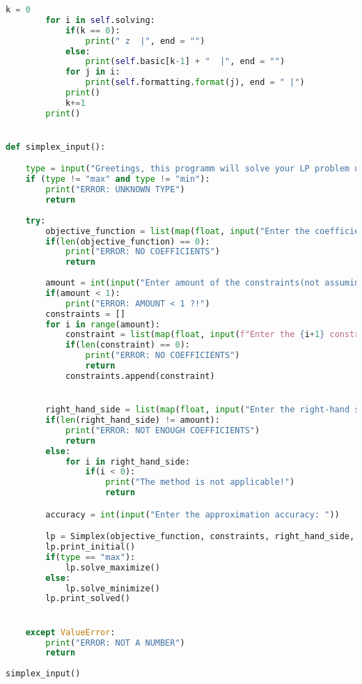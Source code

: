 \documentclass[12pt, legalpaper]{exam}
\begin{document}
\begin{lstlisting}[language=Python, caption=Программа на Python, label=lst:python-code]
        k = 0
        for i in self.solving:
            if(k == 0):
                print(" z  |", end = "")
            else:
                print(self.basic[k-1] + "  |", end = "")
            for j in i:
                print(self.formatting.format(j), end = " |")
            print()
            k+=1
        print()


def simplex_input():

    type = input("Greetings, this programm will solve your LP problem using Simplex method.\nEnter the type of the problem(Max/Min): ").lower()
    if (type != "max" and type != "min"):
        print("ERROR: UNKNOWN TYPE")
        return
    
    try:
        objective_function = list(map(float, input("Enter the coefficients of the objective function: ").split(" ")))
        if(len(objective_function) == 0):
            print("ERROR: NO COEFFICIENTS")
            return
        
        amount = int(input("Enter amount of the constraints(not assuming x>=0): "))
        if(amount < 1):
            print("ERROR: AMOUNT < 1 ?!")
        constraints = []
        for i in range(amount):
            constraint = list(map(float, input(f"Enter the {i+1} constraint function coefficients: ").split(" ")))
            if(len(constraint) == 0):
                print("ERROR: NO COEFFICIENTS")
                return
            constraints.append(constraint)


        right_hand_side = list(map(float, input("Enter the right-hand side numbers: ").split(" ")))
        if(len(right_hand_side) != amount):
            print("ERROR: NOT ENOUGH COEFFICIENTS")
            return
        else:
            for i in right_hand_side:
                if(i < 0):
                    print("The method is not applicable!")
                    return

        accuracy = int(input("Enter the approximation accuracy: "))

        lp = Simplex(objective_function, constraints, right_hand_side, accuracy)
        lp.print_initial()
        if(type == "max"):
            lp.solve_maximize()
        else:
            lp.solve_minimize()
        lp.print_solved()


    except ValueError:
        print("ERROR: NOT A NUMBER")
        return
    
simplex_input()
\end{lstlisting}
\end{document}
